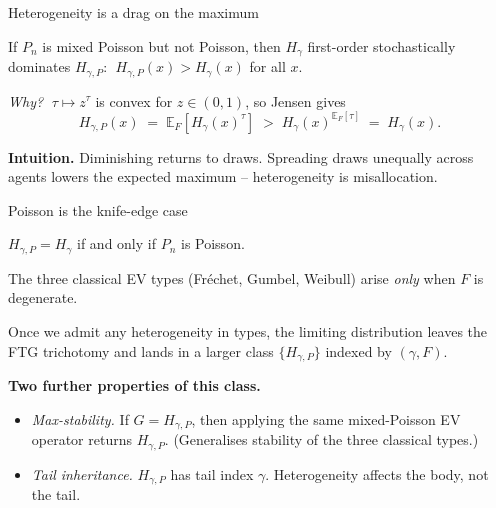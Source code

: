 \documentclass[aspectratio=169,xcolor=dvipsnames]{beamer}
\begin{document}
\begin{frame}{Heterogeneity is a drag on the maximum}
    \begin{corollary}
        If $P_n$ is mixed Poisson but not Poisson, then $H_\gamma$ first-order stochastically dominates $H_{\gamma,P}$:
        $\;H_{\gamma,P}(x) > H_\gamma(x)$ for all $x$.
    \end{corollary}
    \vspace{2mm}
    \emph{Why?} $\;\tau\mapsto z^\tau$ is convex for $z\in(0,1)$, so Jensen gives
    \[
        H_{\gamma,P}(x) \;=\; \mathbb{E}_F[H_\gamma(x)^\tau] \;>\; H_\gamma(x)^{\mathbb{E}_F[\tau]} \;=\; H_\gamma(x).
    \]

    \vspace{2mm}
    \textbf{Intuition.} Diminishing returns to draws. Spreading draws unequally across agents lowers the expected maximum -- heterogeneity is misallocation.
\end{frame}

\begin{frame}{Poisson is the knife-edge case}
    \begin{corollary}
        $H_{\gamma,P} = H_\gamma$ if and only if $P_n$ is Poisson.
    \end{corollary}
    \vspace{2mm}

    The three classical EV types (Fr\'echet, Gumbel, Weibull) arise \emph{only} when $F$ is degenerate.

    \vspace{2mm}
    Once we admit any heterogeneity in types, the limiting distribution leaves the FTG trichotomy and lands in a larger class $\{H_{\gamma,P}\}$ indexed by $(\gamma, F)$.

    \vspace{3mm}
    \textbf{Two further properties of this class.}
    \begin{itemize}
        \item \emph{Max-stability.} If $G = H_{\gamma,P}$, then applying the same mixed-Poisson EV operator returns $H_{\gamma,P}$. (Generalises stability of the three classical types.)
        \item \emph{Tail inheritance.} $H_{\gamma,P}$ has tail index $\gamma$. Heterogeneity affects the body, not the tail.
    \end{itemize}
\end{frame}
\end{document}
